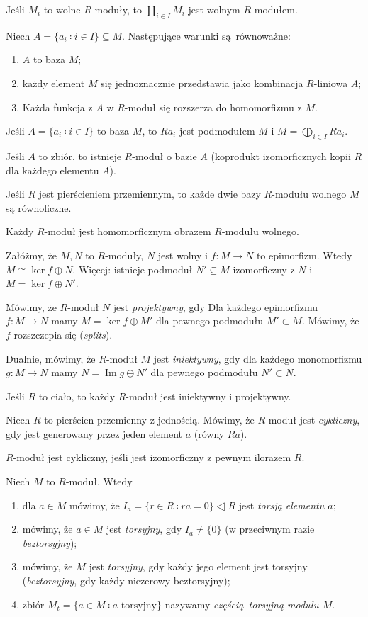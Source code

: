 \documentclass[a4paper, 12pt]{article}
\DeclareMathOperator{\im}{Im}
\newcommand{\+}{\enspace}
\begin{document}
Jeśli $M_i$ to wolne $R$-moduły, to $\coprod_{i∈I} M_i$ jest wolnym $R$-modułem.

Niech $A = \{ a_i ∶ i ∈ I \} ⊆ M$.
Następujące warunki są równoważne:
\begin{enumerate}
	\item $A$ to baza $M$;
	\item każdy element $M$ się jednoznacznie przedstawia jako kombinacja
		$R$-liniowa $A$;
	\item Każda funkcja z $A$ w $R$-moduł się rozszerza do homomorfizmu z $M$.

\end{enumerate}

Jeśli $A = \{ a_i ∶ i ∈ I \}$ to baza $M$,
to $Ra_i$ jest podmodułem $M$ i $M = \bigoplus_{i∈I} R a_i$.

Jeśli $A$ to zbiór, to istnieje $R$-moduł o bazie $A$
(koprodukt izomorficznych kopii $R$ dla każdego elementu $A$).

Jeśli $R$ jest pierścieniem przemiennym,
to każde dwie bazy $R$-modułu wolnego $M$ są równoliczne.

Każdy $R$-moduł jest homomorficznym obrazem $R$-modułu wolnego.

Załóżmy, że $M,N$ to $R$-moduły, $N$ jest wolny i
$f: M → N$ to epimorfizm.
Wtedy $M ≅ \ker f ⊕ N$.
Więcej: istnieje podmoduł $N' ⊆ M$ izomorficzny z $N$
i $M = \ker f ⊕ N'$.

Mówimy, że $R$-moduł $N$ jest \textit{projektywny}, gdy
Dla każdego epimorfizmu $f: M → N$ mamy
$M = \ker f ⊕ M'$ dla pewnego podmodułu $M' ⊂ M$.
Mówimy, że $f$ rozszczepia się (\textit{splits}).

Dualnie, mówimy, że $R$-moduł $M$ jest \textit{iniektywny}, gdy
dla każdego monomorfizmu $g: M → N$ mamy
$N = \im g ⊕ N'$ dla pewnego podmodułu $N' ⊂ N$.

Jeśli $R$ to ciało, to każdy $R$-moduł jest iniektywny i projektywny.

Niech $R$ to pierścien przemienny z jednością.
Mówimy, że $R$-moduł jest \textit{cykliczny}, gdy jest generowany przez
jeden element $a$ (równy $Ra$).

$R$-moduł jest cykliczny, jeśli jest izomorficzny z pewnym
ilorazem $R$.

Niech $M$ to $R$-moduł.
Wtedy
\begin{enumerate}
	\item dla $a ∈ M$ mówimy,
		że $I_a = \{ r∈R ∶ ra = 0 \} ◁ R$ jest \textit{torsją elementu $a$};
	\item mówimy, że $a∈M$ jest \textit{torsyjny}, gdy $I_a ≠ \{ 0 \}$
		(w przeciwnym razie \textit{beztorsyjny});
	\item mówimy, że $M$ jest \textit{torsyjny}, gdy każdy jego element jest torsyjny
		(\textit{beztorsyjny}, gdy każdy niezerowy beztorsyjny);
	\item zbiór $M_t = \{ a∈M ∶ a\text{ torsyjny} \}$
		nazywamy \textit{częścią torsyjną modułu $M$}.
\end{enumerate}
\end{document}
